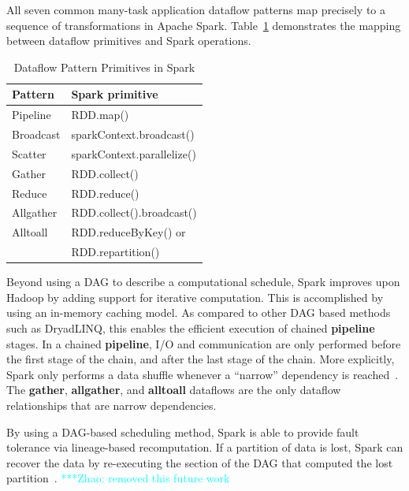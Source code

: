 \documentclass[10pt, conference, compsocconf]{IEEEtran}
\newcommand{\zhaonote}[1]{{\textcolor{cyan}    { ***Zhao:      #1 }}}
\newcommand{\zhaonote}[1]{}
\newcommand{\up}{\vspace*{-1em}}
\begin{document}
All seven common many-task application dataflow patterns map precisely to a sequence of
transformations in \linebreak Apache Spark. Table~\ref{tb:Patterns} demonstrates the mapping between
dataflow primitives and Spark operations.

\begin{table}[h]
  \begin{center}
  \caption{Dataflow Pattern Primitives in Spark}
    \begin{small}
    \begin{tabular}{ | p{1.8cm} | p{5.5cm} |}
    \hline
    Pattern & Spark primitive \\
    \hline \hline
    Pipeline & RDD.map()  \\ 
    Broadcast & sparkContext.broadcast() \\   
    Scatter & sparkContext.parallelize() \\ 
    Gather & RDD.collect() \\ 
    Reduce & RDD.reduce() \\ 
    Allgather & RDD.collect().broadcast() \\ 
    Alltoall & RDD.reduceByKey() or \\
 & RDD.repartition() \\ 
    \hline
    \end{tabular}
    \end{small}   
  \label{tb:Patterns}     	
  \end{center}
\end{table}

\up
Beyond using a DAG to describe a computational schedule, Spark improves upon
Hadoop by adding support for iterative computation. This is accomplished by using an
in-memory caching model. As compared to other DAG based methods such as DryadLINQ, this enables
the efficient execution of chained \textbf{pipeline} stages. In a chained \textbf{pipeline},
I/O and communication are only performed before the first stage of the chain, and after the
last stage of the chain. More explicitly, Spark only performs a data shuffle whenever a
``narrow'' dependency is reached~\cite{zaharia12}. The \textbf{gather}, \textbf{allgather},
and \textbf{alltoall} dataflows are the only dataflow relationships that are narrow dependencies.

By using a DAG-based scheduling method, Spark is able to provide fault tolerance via
lineage-based recomputation. If a partition of data is lost, Spark can recover the data
by re-executing the section of the DAG that computed the lost partition~\cite{zaharia12}. 
\zhaonote{removed this future work}
\end{document}
